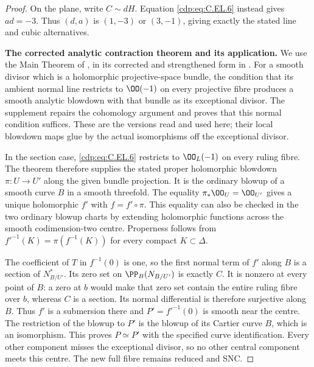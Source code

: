 \begin{proof}
On the plane, write $C\sim dH$. Equation \eqref{cdp:eq:C.EL.6} instead
gives $ad=-3$. Thus $(d,a)$ is $(1,-3)$ or $(3,-1)$,
giving exactly the stated line and cubic alternatives.

\par\medskip\noindent\textbf{The corrected analytic contraction theorem and its application.}
We use the Main Theorem of \cite[p.~484]{Nakano1970}, in its
corrected and strengthened form in
\cite[\S2, Theorem~2' and Proposition~9']{FujikiNakano1971}.
For a smooth divisor which is a holomorphic projective-space
bundle, the condition that its ambient normal line restricts to
$\OO(-1)$ on every projective fibre produces a smooth analytic
blowdown with that bundle as its exceptional divisor. The
supplement repairs the cohomology argument and proves that this
normal condition suffices. These are the versions read and used
here; their local blowdown maps glue by the actual isomorphisms
off the exceptional divisor.

In the section case, \eqref{cdp:eq:C.EL.6} restricts to $\OO_L(-1)$ on
every ruling fibre. The theorem therefore supplies the stated
proper holomorphic blowdown $\pi:U\to U'$ along the given
bundle projection. It is the ordinary blowup of a smooth curve
$B$ in a smooth threefold. The equality
$\pi_*\OO_U=\OO_{U'}$ gives a unique holomorphic $f'$ with
$f=f'\circ\pi$. This equality can also be checked in the two
ordinary blowup charts by extending holomorphic functions
across the smooth codimension-two centre. Properness follows
from $f'^{-1}(K)=\pi(f^{-1}(K))$ for every compact
$K\subset\Delta$.

The coefficient of $T$ in $f^{-1}(0)$ is one, so the first
normal term of $f'$ along $B$ is a section of $N_{B/U'}^*$.
Its zero set on $\PP_B(N_{B/U'})$ is exactly $C$.
It is nonzero at every point of $B$: a zero at $b$ would
make that zero set contain the entire ruling fibre over $b$,
whereas $C$ is a section. Its normal differential is therefore
surjective along $B$. Thus $f'$ is a submersion there and
$P'=f'^{-1}(0)$ is smooth near the centre. The restriction of
the blowup to $P'$ is the blowup of its Cartier curve $B$,
which is an isomorphism. This proves $P\simeq P'$ with
the specified curve identification. Every other component
misses the exceptional divisor, so no other central component
meets this centre. The new full fibre remains reduced and SNC.


\end{proof}
